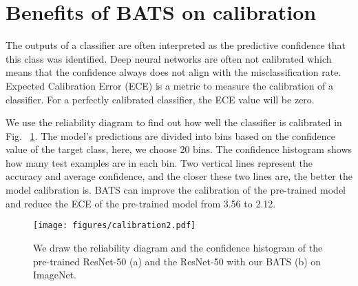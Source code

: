 \documentclass{article}
\begin{document}
{
\section{Benefits of BATS on calibration}

The outputs of a classifier are often interpreted as the predictive confidence that this class was identified. Deep neural networks are often not calibrated which means that the confidence always does not align with the misclassification rate. Expected Calibration Error (ECE) is a metric to measure the calibration of a classifier. For a perfectly calibrated classifier, the ECE value will be zero. 

We use the reliability diagram to find out how well the classifier is calibrated in Fig. ~\ref{fig:calibration}. The model's predictions are divided into bins based on the confidence value of the target class, here, we choose 20 bins. The confidence histogram shows how many test examples are in each bin. Two vertical lines represent the accuracy and average confidence, and the closer these two lines are, the better the model calibration is.  
BATS can improve the calibration of the pre-trained model and reduce the ECE of the pre-trained model from 3.56 to 2.12.

}

\begin{figure}[htbp] 
 \vskip 0.2in
 \centering
 \centerline{\texttt{[image: figures/calibration2.pdf]}}
 \caption{We draw the reliability diagram and the confidence histogram of the pre-trained ResNet-50 (a) and the ResNet-50 with our BATS (b) on ImageNet.}
 \label{fig:calibration}
 \vskip -0.2in
 \end{figure}
\end{document}
